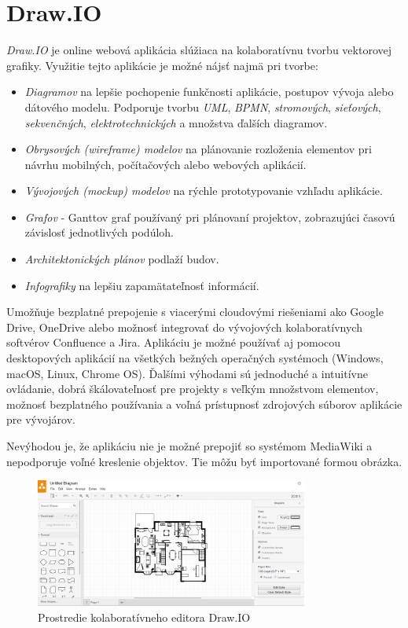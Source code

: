 \section{Draw.IO}
\textit{Draw.IO} je online webová aplikácia slúžiaca na kolaboratívnu tvorbu vektorovej grafiky. Využitie tejto aplikácie je možné nájsť najmä pri tvorbe:
\begin{itemize}
	\item \textit{Diagramov} na lepšie pochopenie funkčnosti aplikácie, postupov vývoja alebo dátového modelu. Podporuje tvorbu \textit{UML}, \textit{BPMN}, \textit{stromových}, \textit{sieťových}, \textit{sekvenčných}, \textit{elektrotechnických} a množstva ďalších diagramov.
	\item \textit{Obrysových (wireframe) modelov} na plánovanie rozloženia elementov pri návrhu mobilných, počítačových alebo webových aplikácií.
	\item \textit{Vývojových (mockup) modelov} na rýchle prototypovanie vzhľadu aplikácie.
	\item \textit{Grafov} - Ganttov graf používaný pri plánovaní projektov, zobrazujúci časovú závislosť jednotlivých podúloh.
	\item \textit{Architektonických plánov} podlaží budov.
	\item \textit{Infografiky} na lepšiu zapamätateľnosť informácií.
\end{itemize}
Umožňuje bezplatné prepojenie s viacerými cloudovými riešeniami ako Google Drive, OneDrive alebo možnosť integrovať do vývojových kolaboratívnych softvérov Confluence a Jira. Aplikáciu je možné používať aj pomocou desktopových aplikácií na všetkých bežných operačných systémoch (Windows, macOS, Linux, Chrome OS). 
Ďalšími výhodami sú jednoduché a intuitívne ovládanie, dobrá škálovateľnosť pre projekty s veľkým množstvom elementov, možnosť bezplatného používania a voľná prístupnosť zdrojových súborov aplikácie pre vývojárov.

Nevýhodou je, že aplikáciu nie je možné prepojiť so systémom MediaWiki a nepodporuje voľné kreslenie objektov. Tie môžu byť importované formou obrázka.

\begin{figure}[h]
	\centerline{\includegraphics[width=0.8\textwidth]{images/drawio}}
	\caption[Editor Draw.IO]{Prostredie kolaboratívneho editora Draw.IO}
	\label{obr:DrawIO}
\end{figure}
\FloatBarrier